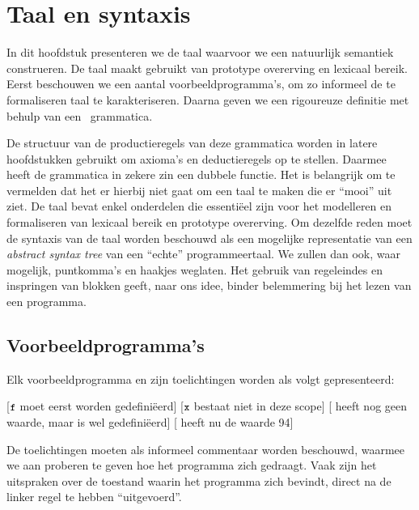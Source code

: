 
\chapter{Taal en syntaxis}

In dit hoofdstuk presenteren we de taal waarvoor we een natuurlijk semantiek construeren. De taal maakt gebruikt van prototype overerving en lexicaal bereik. Eerst beschouwen we een aantal voorbeeldprogramma's, om zo informeel de te formaliseren taal te karakteriseren. Daarna geven we een rigoureuze definitie met behulp van een \BNF\ grammatica.

De structuur van de productieregels van deze grammatica worden in latere hoofdstukken gebruikt om axioma's en deductieregels op te stellen. Daarmee heeft de grammatica in zekere zin een dubbele functie.
Het is belangrijk om te vermelden dat het er hierbij niet gaat om een taal te maken die er “mooi” uit ziet. De taal bevat enkel onderdelen die essentiëel zijn voor het modelleren en formaliseren van lexicaal bereik en prototype overerving. Om dezelfde reden moet de syntaxis van de taal worden beschouwd als een mogelijke representatie van een \emph{abstract syntax tree} van een “echte” programmeertaal. We zullen dan ook, waar mogelijk, puntkomma's en haakjes weglaten. Het gebruik van regeleindes en inspringen van blokken geeft, naar ons idee, binder belemmering bij het lezen van een programma.

\section{Voorbeeldprogramma's}
\label{sec:voorbeelden}

Elk voorbeeldprogramma en zijn toelichtingen worden als volgt gepresenteerd:

\begin{NoBreak}
\codeFragmentCaption
\begin{codelines}
  [$\text{\ttfamily\small\upshape f}$ moet eerst worden gedefiniëerd]
  \codeLine{}[$\text{\ttfamily\small\upshape x}$ bestaat niet in deze scope]
  [ heeft nog geen waarde, maar is wel gedefiniëerd]
  [ heeft nu de waarde 94]
\end{codelines}
\end{NoBreak}

De toelichtingen moeten als informeel commentaar worden beschouwd, waarmee we aan proberen te geven hoe het programma zich gedraagt. Vaak zijn het uitspraken over de toestand waarin het programma zich bevindt, direct na de linker regel te hebben “uitgevoerd”.

